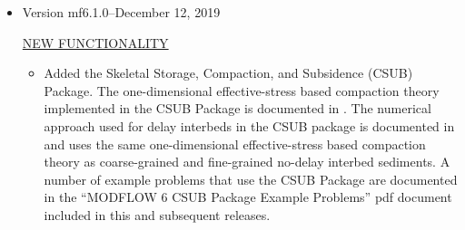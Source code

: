 \begin{itemize}
	\item Version mf6.1.0--December 12, 2019
	
	\underline{NEW FUNCTIONALITY}
	\begin{itemize}
		\item Added the Skeletal Storage, Compaction, and Subsidence (CSUB) Package. The one-dimensional effective-stress based compaction theory implemented in the CSUB Package is documented in \cite{leake2007modflow}. The numerical approach used for delay interbeds in the CSUB package is documented in \cite{hoffmann2003modflow} and uses the same one-dimensional effective-stress based compaction theory as coarse-grained and fine-grained no-delay interbed sediments. A number of example problems that use the CSUB Package are documented in the ``MODFLOW 6 CSUB Package Example Problems'' pdf document included in this and subsequent releases.
	\end{itemize}
	

\end{itemize}
